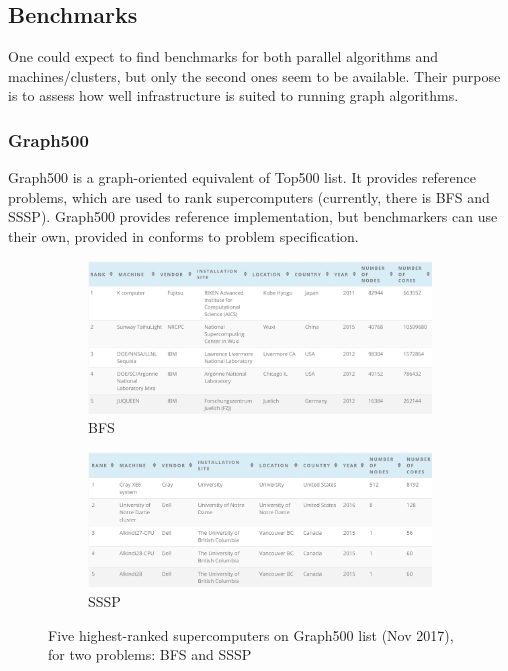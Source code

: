\subsection{Benchmarks}
One could expect to find benchmarks for both parallel algorithms and machines/clusters, but only the second ones seem to be available. Their purpose is to assess how well infrastructure is suited to running graph algorithms.

\subsubsection{Graph500}
Graph500 \cite{www-graph500} is a graph-oriented equivalent of Top500 list. It provides reference problems, which are used to rank supercomputers (currently, there is BFS and SSSP). Graph500 provides reference implementation, but benchmarkers can use their own, provided in conforms to problem specification.

\begin{figure}
    \centering
    
    \begin{subfigure}[h]{1.0\textwidth}
        \centering
        \includegraphics[scale=0.2]{images/graph500-bfs.jpg}
        \caption{BFS}
        \label{fig:graph500-bfs}
    \end{subfigure}
    
    \begin{subfigure}[h]{1.0\textwidth}
        \centering
        \includegraphics[scale=0.2]{images/graph500-sssp.jpg}
        \caption{SSSP}
        \label{fig:graph500-sssp}
    \end{subfigure}
    
    \caption{Five highest-ranked supercomputers on Graph500 list (Nov 2017), for two problems: BFS and SSSP}
\end{figure}


